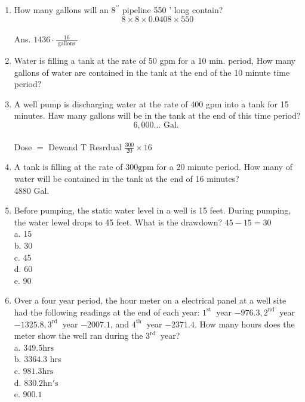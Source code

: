 \documentclass{article}
\begin{document}
\begin{enumerate}
\item How many gallons will an $8^{\prime \prime}$ pipeline 550 ' long contain?\\
$$8 \times 8 \times 0.0408 \times 550$$\\
Ans. $1436 \cdot \frac{16}{\text { gallons }}$\\

\item Water is filling a tank at the rate of 50 gpm for a 10 min. period, How many gallons of water are contained in the tank at the end of the 10 minute time period?\\

\item A well pump is discharging water at the rate of 400 gpm into a tank for 15 minutes. Haw many gallons will be in the tank at the end of this time period?\\
$$6,000 \ldots \text { Gal. }$$\\
Dose $=$ Dewand T Resrdual $\frac{300}{20} \times 16$\\

\item A tank is filling at the rate of $300 \mathrm{gpm}$ for a 20 minute period. How many of water will be contained in the tank at the end of 16 minutes?\\
4880 Gal.\\

\item Before pumping, the static water level in a well is 15 feet. During pumping, the water lewel drops to 45 feet. What is the drawdown? $45-15=30$\\
a. 15\\
b. 30\\
c. 45\\
d. 60\\
e. 90\\

\item Over a four year period, the hour meter on a electrical panel at a well site had the following readings at the end of each year: $1^{\text {st }}$ year $-976.3,2^{\text {nd }}$ year $-1325.8,3^{\text {rd }}$ year $-2007.1$, and $4^{\text {th }}$ year $-2371.4$. How many hours does the meter show the well ran during the $3^{\text {rd }}$ year?\\
a. $349.5 \mathrm{hrs}$\\
b. $3364.3$ hrs\\
c. $981.3 \mathrm{hrs}$\\
d.  $830.2 \mathrm{hn \prime s}$\\
e. $900.1$\\


\end{enumerate}
\end{document}
